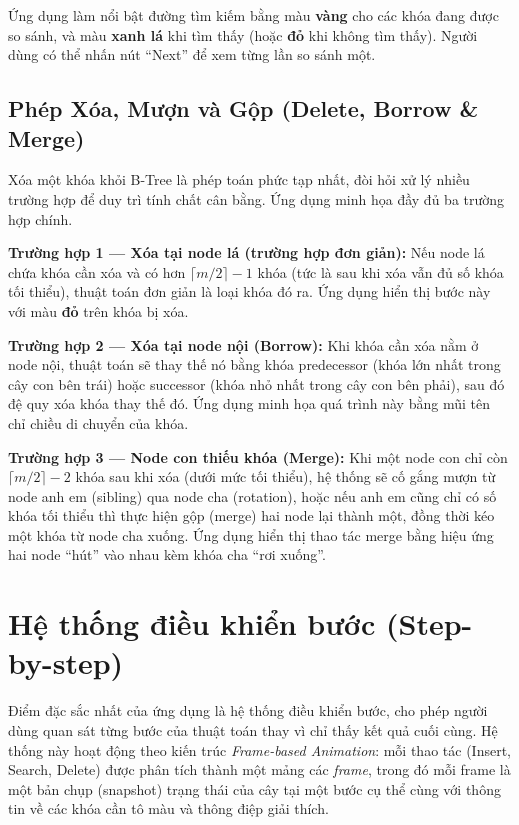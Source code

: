 \documentclass[12pt,a4paper]{article}
\begin{document}
Ứng dụng làm nổi bật đường tìm kiếm bằng màu \textcolor{highlightcolor}{\textbf{vàng}} cho các khóa đang được so sánh, và màu \textcolor{foundcolor}{\textbf{xanh lá}} khi tìm thấy (hoặc \textcolor{warncolor}{\textbf{đỏ}} khi không tìm thấy). Người dùng có thể nhấn nút ``Next'' để xem từng lần so sánh một.

\subsection{Phép Xóa, Mượn và Gộp (Delete, Borrow \& Merge)}

Xóa một khóa khỏi B-Tree là phép toán phức tạp nhất, đòi hỏi xử lý nhiều trường hợp để duy trì tính chất cân bằng. Ứng dụng minh họa đầy đủ ba trường hợp chính.

\textbf{Trường hợp 1 — Xóa tại node lá (trường hợp đơn giản):} Nếu node lá chứa khóa cần xóa và có hơn $\lceil m/2 \rceil - 1$ khóa (tức là sau khi xóa vẫn đủ số khóa tối thiểu), thuật toán đơn giản là loại khóa đó ra. Ứng dụng hiển thị bước này với màu \textcolor{warncolor}{\textbf{đỏ}} trên khóa bị xóa.

\textbf{Trường hợp 2 — Xóa tại node nội (Borrow):} Khi khóa cần xóa nằm ở node nội, thuật toán sẽ thay thế nó bằng khóa predecessor (khóa lớn nhất trong cây con bên trái) hoặc successor (khóa nhỏ nhất trong cây con bên phải), sau đó đệ quy xóa khóa thay thế đó. Ứng dụng minh họa quá trình này bằng mũi tên chỉ chiều di chuyển của khóa.

\textbf{Trường hợp 3 — Node con thiếu khóa (Merge):} Khi một node con chỉ còn $\lceil m/2 \rceil - 2$ khóa sau khi xóa (dưới mức tối thiểu), hệ thống sẽ cố gắng mượn từ node anh em (sibling) qua node cha (rotation), hoặc nếu anh em cũng chỉ có số khóa tối thiểu thì thực hiện gộp (merge) hai node lại thành một, đồng thời kéo một khóa từ node cha xuống. Ứng dụng hiển thị thao tác merge bằng hiệu ứng hai node ``hút'' vào nhau kèm khóa cha ``rơi xuống''.

\section{Hệ thống điều khiển bước (Step-by-step)}

Điểm đặc sắc nhất của ứng dụng là hệ thống điều khiển bước, cho phép người dùng quan sát từng bước của thuật toán thay vì chỉ thấy kết quả cuối cùng. Hệ thống này hoạt động theo kiến trúc \emph{Frame-based Animation}: mỗi thao tác (Insert, Search, Delete) được phân tích thành một mảng các \emph{frame}, trong đó mỗi frame là một bản chụp (snapshot) trạng thái của cây tại một bước cụ thể cùng với thông tin về các khóa cần tô màu và thông điệp giải thích.
\end{document}
